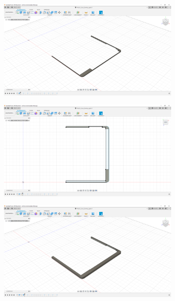 \begin{figure}[h!tb]
	\begin{subfigure}[t]{.3\linewidth}
		\includegraphics[width=\linewidth]{img/konstruktion_gehaeuse_rechts_001.png}
		\caption[]{}
		\label{fig:design-right-01}
	\end{subfigure}
	\begin{subfigure}[t]{.3\linewidth}
		\includegraphics[width=\linewidth]{img/konstruktion_gehaeuse_rechts_002.png}
		\caption[]{}
		\label{fig:design-right-02}
	\end{subfigure}
	\begin{subfigure}[t]{.3\linewidth}
		\includegraphics[width=\linewidth]{img/konstruktion_gehaeuse_rechts_003.png}

\end{subfigure}
\end{figure}
